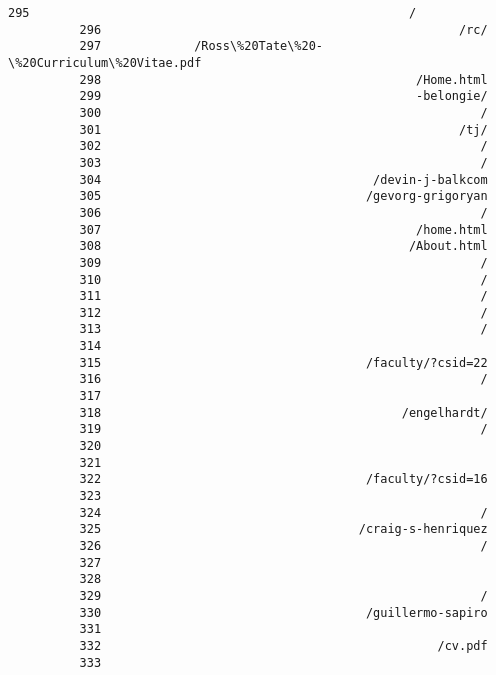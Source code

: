\documentclass[11pt]{article}
\begin{document}
\begin{Verbatim}[commandchars=\\\{\}]
          295                                                     /
          296                                                  /rc/
          297             /Ross\%20Tate\%20-\%20Curriculum\%20Vitae.pdf
          298                                            /Home.html
          299                                            -belongie/
          300                                                     /
          301                                                  /tj/
          302                                                     /
          303                                                     /
          304                                      /devin-j-balkcom
          305                                     /gevorg-grigoryan
          306                                                     /
          307                                            /home.html
          308                                           /About.html
          309                                                     /
          310                                                     /
          311                                                     /
          312                                                     /
          313                                                     /
          314                                                      
          315                                     /faculty/?csid=22
          316                                                     /
          317                                                      
          318                                          /engelhardt/
          319                                                     /
          320                                                      
          321                                                      
          322                                     /faculty/?csid=16
          323                                                      
          324                                                     /
          325                                    /craig-s-henriquez
          326                                                     /
          327                                                      
          328                                                      
          329                                                     /
          330                                     /guillermo-sapiro
          331                                                      
          332                                               /cv.pdf
          333                                                      

\end{Verbatim}
\end{document}
